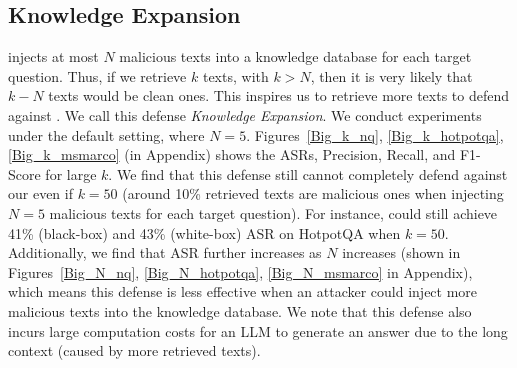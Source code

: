 \vspace{-3mm}
\subsection{Knowledge Expansion}
{\name} injects at most $N$ malicious texts into a knowledge database for each target question. Thus, if we retrieve $k$ texts, with $k>N$, then it is very likely that $k-N$ texts would be clean ones. This inspires us to retrieve more texts to defend against {\name}. We call this defense \emph{Knowledge Expansion}. We conduct experiments under the default setting, where $N=5$. Figures~\ref{Big_k_nq}, \ref{Big_k_hotpotqa}, \ref{Big_k_msmarco} (in Appendix) shows the ASRs, Precision, Recall, and F1-Score for large $k$. We find that this defense still cannot completely defend against our {\name} even if $k=50$ (around 10\% retrieved texts are malicious ones when injecting $N=5$ malicious texts for each target question). For instance, {\name} could still achieve 41\% (black-box) and 43\% (white-box) ASR on HotpotQA when $k=50$. Additionally, we find that ASR further increases as $N$ increases (shown in Figures~\ref{Big_N_nq}, \ref{Big_N_hotpotqa}, \ref{Big_N_msmarco} in Appendix), which means this defense is less effective when an attacker could inject more malicious texts into the knowledge database. We note that this defense also incurs large computation costs for an LLM to generate an answer due to the long context (caused by more retrieved texts).  



